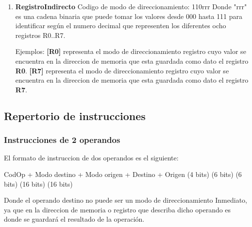 \begin{enumerate}
\item \textbf{RegistroIndirecto}
Codigo de modo de direccionamiento: 110rrr 
Donde "rrr" es una cadena binaria que puede tomar los valores desde 000 hasta 111 para identificar según el numero decimal que representen los diferentes ocho registros R0..R7.

Ejemplos:
\textbf{[R0]} representa el modo de direccionamiento registro cuyo valor se encuentra en la direccion de memoria que esta guardada como dato el registro \textbf{R0}.
\textbf{[R7]} representa el modo de direccionamiento registro cuyo valor se encuentra en la direccion de memoria que esta guardada como dato el registro \textbf{R7}.

\end{enumerate}


\subsection{Repertorio de instrucciones}

\subsubsection{Instrucciones de 2 operandos}
El formato de instruccion de dos operandos es el siguiente:

  CodOp   +  Modo destino +  Modo origen +  Destino  +   Origen
(4 bits)       (6 bits)        (6 bits)    (16 bits)    (16 bits)  

Donde el operando destino no puede ser un modo de direccionamiento Inmediato, ya que en la direccion de memoria o registro que describa dicho operando es donde se guardará el resultado de la operación.

